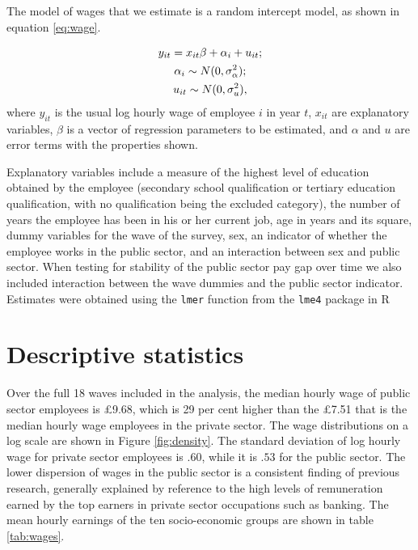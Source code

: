 \documentclass[a4paper,11pt,titlepage]{article}
\begin{document}
The model of wages that we estimate is a random intercept model, as shown in equation \eqref{eq:wage}.

\begin{gather}\label{eq:wage}
y_{it} = x_{it} \beta + \alpha_i + u_{it}; \notag\\
\alpha_i \sim N(0,\sigma_\alpha^2); \\
u_{it} \sim N(0,\sigma_u^2),\notag
\end{gather}
where $y_{it}$ is the usual log hourly wage of employee $i$ in year $t$, $x_{it}$ are explanatory variables, $\beta$ is a vector of regression parameters to be estimated, and $\alpha$ and $u$ are error terms with the properties shown.

Explanatory variables include a measure of the highest level of education obtained by the employee (secondary school qualification or tertiary education qualification, with no qualification being the excluded category), the number of years the employee has been in his or her current job, age in years and its square, dummy variables for the wave of the survey, sex, an indicator of whether the employee works in the public sector, and an interaction between sex and public sector.  When testing for stability of the public sector pay gap over time we also included interaction between the wave dummies and the public sector indicator.  Estimates were obtained using the \texttt{lmer} function from the \texttt{lme4} package in R \citep{R2011,lme2011}

\section{Descriptive statistics}
Over the full 18 waves included in the analysis, the median hourly wage of public sector employees is \pounds 9.68, which is 29 per cent higher than the \pounds 7.51 that is the median hourly wage employees in the private sector.  The wage distributions on a log scale are shown in Figure \ref{fig:density}.  The standard deviation of log hourly wage for private sector employees is $.60$, while it is $.53$ for the public sector.  The lower dispersion of wages in the public sector is a consistent finding of previous research, generally explained by reference to the high levels of remuneration earned by the top earners in private sector occupations such as banking.  The mean hourly earnings of the ten socio-economic groups are shown in table \ref{tab:wages}.
\end{document}
